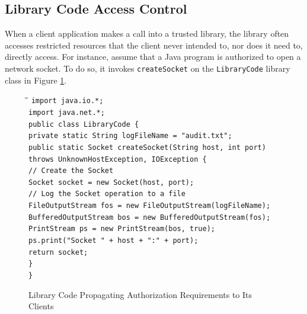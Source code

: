 \subsection{Library Code Access Control} \label{sec:LibraryCodeAC}
When a client application makes a call into a trusted library, the
library often accesses restricted resources that the client never
intended to, nor does it need to, directly access. For instance,
assume that a Java program is authorized to open a network socket.
To do so, it invokes \texttt{createSocket} on the
\texttt{LibraryCode} library class in Figure
\ref{fig:LibraryCode1}.
\begin{figure}[h]
	\begin{tabbing}
		\hspace*{0.25in}\=\hspace*{0.25in}\=\hspace*{0.25in}\=\hspace*{0.25in}\kill
		\texttt{import java.io.*;}\\
		\texttt{import java.net.*;}\\
		\verb"public class LibraryCode {"\\
			\>\texttt{private static String logFileName = "audit.txt";}\\
			\>\verb"public static Socket createSocket(String host, int port)"\\
			\>\>\>\verb"throws UnknownHostException, IOException {"\\
				\>\>\texttt{// Create the Socket}\\
				\>\>\texttt{Socket socket = new Socket(host, port);}\\
				\>\>\texttt{// Log the Socket operation to a file}\\
				\>\>\texttt{FileOutputStream fos = new FileOutputStream(logFileName);}\\
				\>\>\texttt{BufferedOutputStream bos = new BufferedOutputStream(fos);}\\
				\>\>\texttt{PrintStream ps = new PrintStream(bos, true);}\\
				\>\>\texttt{ps.print("Socket " + host + ":" + port);}\\
				\>\>\texttt{return socket;}\\
				\>\verb"}"\\
			\verb"}"
	\end{tabbing}
	\caption{Library Code Propagating Authorization Requirements to
		Its Clients} \label{fig:LibraryCode1}
\end{figure}

